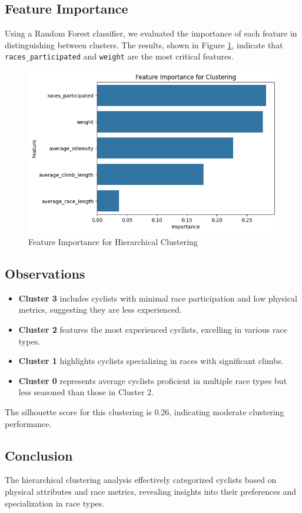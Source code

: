\documentclass{article}
\begin{document}
\subsection{Feature Importance}
Using a Random Forest classifier, we evaluated the importance of each feature in distinguishing between clusters. The results, shown in Figure \ref{fig:feature_importance}, indicate that \texttt{races\_participated} and \texttt{weight} are the most critical features.

\begin{figure}[H]
    \centering
    \includegraphics[width=0.55\linewidth]{feature_importance_dend.png}
    \caption{Feature Importance for Hierarchical Clustering}
    \label{fig:feature_importance}
\end{figure}

\subsection{Observations}
\begin{itemize}
    \item \textbf{Cluster 3} includes cyclists with minimal race participation and low physical metrics, suggesting they are less experienced.
    \item \textbf{Cluster 2} features the most experienced cyclists, excelling in various race types.
    \item \textbf{Cluster 1} highlights cyclists specializing in races with significant climbs.
    \item \textbf{Cluster 0} represents average cyclists proficient in multiple race types but less seasoned than those in Cluster 2.
\end{itemize}

The silhouette score for this clustering is 0.26, indicating moderate clustering performance.

\subsection{Conclusion}
The hierarchical clustering analysis effectively categorized cyclists based on physical attributes and race metrics, revealing insights into their preferences and specialization in race types.
\end{document}
